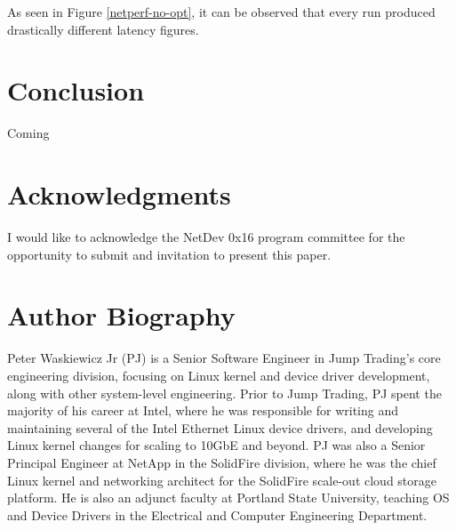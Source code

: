 \documentclass[letterpaper]{article}
\begin{document}
As seen in Figure \ref{netperf-no-opt}, it can be observed that every run produced drastically different latency figures.

\section{Conclusion}
Coming

\section{Acknowledgments}
I would like to acknowledge the NetDev 0x16 program committee for the opportunity to submit and invitation to present this paper.




\section{Author Biography}
Peter Waskiewicz Jr (PJ) is a Senior Software Engineer in Jump Trading's core engineering division, focusing on Linux kernel and device driver development, along with other system-level engineering.  Prior to Jump Trading, PJ spent the majority of his career at Intel, where he was responsible for writing and maintaining several of the Intel Ethernet Linux device drivers, and developing Linux kernel changes for scaling to 10GbE and beyond.  PJ was also a Senior Principal Engineer at NetApp in the SolidFire division, where he was the chief Linux kernel and networking architect for the SolidFire scale-out cloud storage platform. He is also an adjunct faculty at Portland State University, teaching OS and Device Drivers in the Electrical and Computer Engineering Department.
\end{document}
